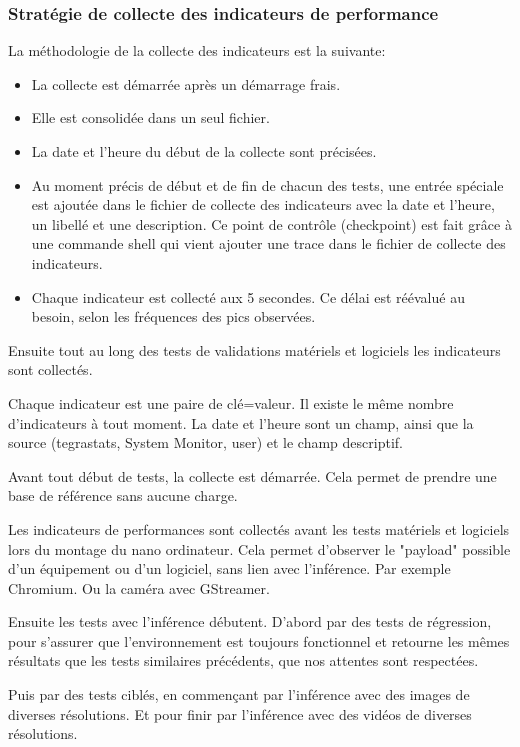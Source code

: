 \subsubsection{Stratégie de collecte des indicateurs de performance}
\par La méthodologie de la collecte des indicateurs est la suivante: 
\begin{itemize}
    \item La collecte est démarrée après un démarrage frais.
    \item Elle est consolidée dans un seul fichier.
    \item La date et l'heure du début de la collecte sont précisées.
    \item Au moment précis de début et de fin de chacun des tests, une entrée spéciale est ajoutée dans le fichier de collecte des indicateurs avec la date et l'heure, un libellé et une description. Ce point de contrôle (checkpoint) est fait grâce à une commande shell qui vient ajouter une trace dans le fichier de collecte des indicateurs.
    \item Chaque indicateur est collecté aux 5 secondes. Ce délai est réévalué au besoin, selon les fréquences des pics observées. 
\end{itemize}
\par Ensuite tout au long des tests de validations matériels et logiciels les indicateurs sont collectés. 
\par Chaque indicateur est une paire de clé=valeur. Il existe le même nombre d'indicateurs à tout moment. La date et l'heure sont un champ, ainsi que la source (tegrastats, System Monitor, user) et le champ descriptif. 
\par Avant tout début de tests, la collecte est démarrée. Cela permet de prendre une base de référence sans aucune charge.
\par Les indicateurs de performances sont collectés avant les tests matériels et logiciels lors du montage du nano ordinateur. Cela permet d'observer le "payload" possible d'un équipement ou d'un logiciel, sans lien avec l'inférence. Par exemple Chromium. Ou la caméra avec GStreamer. 
\par Ensuite les tests avec l'inférence débutent. D'abord par des tests de régression, pour s'assurer que l'environnement est toujours fonctionnel et retourne les mêmes résultats que les tests similaires précédents, que nos attentes sont respectées. 
\par Puis par des tests ciblés, en commençant par l'inférence avec des images de diverses résolutions. Et pour finir par l'inférence avec des vidéos de diverses résolutions. 
